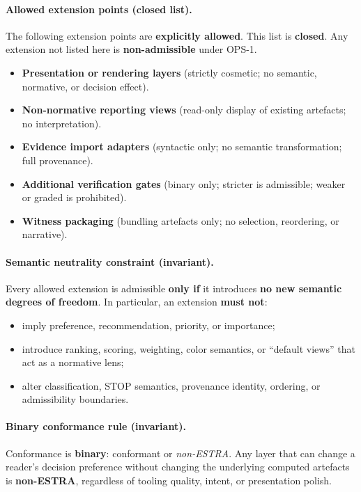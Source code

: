 \paragraph{Allowed extension points (closed list).}
The following extension points are \textbf{explicitly allowed}.
This list is \textbf{closed}.
Any extension not listed here is \textbf{non-admissible} under OPS-1.
\begin{itemize}
  \item \textbf{Presentation or rendering layers}
        (strictly cosmetic; no semantic, normative, or decision effect).
  \item \textbf{Non-normative reporting views}
        (read-only display of existing artefacts; no interpretation).
  \item \textbf{Evidence import adapters}
        (syntactic only; no semantic transformation; full provenance).
  \item \textbf{Additional verification gates}
        (binary only; stricter is admissible; weaker or graded is prohibited).
  \item \textbf{Witness packaging}
        (bundling artefacts only; no selection, reordering, or narrative).
\end{itemize}

\paragraph{Semantic neutrality constraint (invariant).}
Every allowed extension is admissible \textbf{only if} it introduces
\textbf{no new semantic degrees of freedom}.
In particular, an extension \textbf{must not}:
\begin{itemize}
  \item imply preference, recommendation, priority, or importance;
  \item introduce ranking, scoring, weighting, color semantics, or
        ``default views'' that act as a normative lens;
  \item alter classification, STOP semantics, provenance identity,
        ordering, or admissibility boundaries.
\end{itemize}

\paragraph{Binary conformance rule (invariant).}
Conformance is \textbf{binary}: conformant or \emph{non-ESTRA}.
Any layer that can change a reader's decision preference without changing
the underlying computed artefacts is \textbf{non-ESTRA}, regardless of
tooling quality, intent, or presentation polish.

